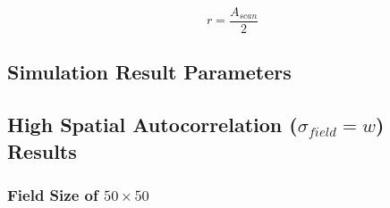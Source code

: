 \begin{equation}
	r = \frac{A_{scan}}{2}
\end{equation}

\subsection{Simulation Result Parameters}


\subsection{High Spatial Autocorrelation ($\sigma_{field} = w$) Results}
\subsubsection{Field Size of $50\times50$}


